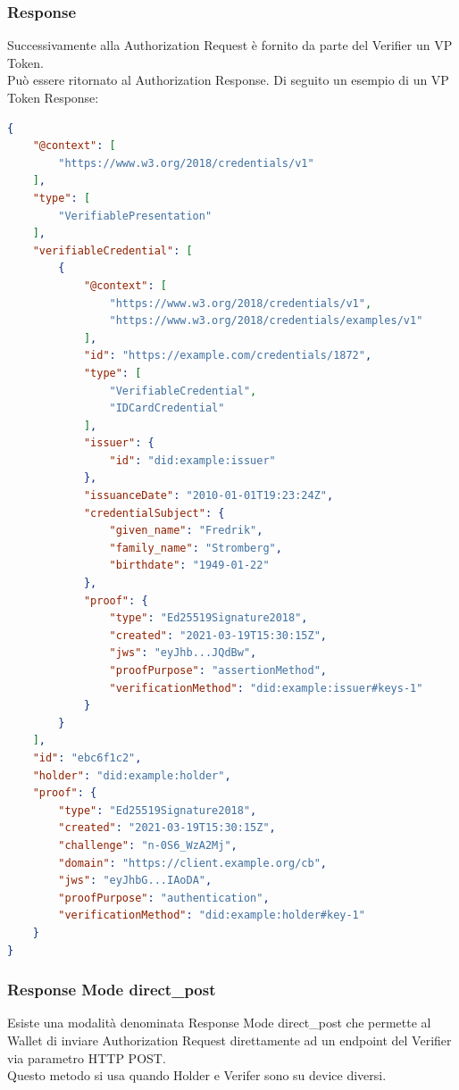 \subsubsection{Response}
Successivamente alla Authorization Request è fornito da parte del Verifier un VP Token.\\
Può essere ritornato al Authorization Response.
Di seguito un esempio di un VP Token Response:
\begin{lstlisting}[language=json,firstnumber=1]
{
    "@context": [
        "https://www.w3.org/2018/credentials/v1"
    ],
    "type": [
        "VerifiablePresentation"
    ],
    "verifiableCredential": [
        {
            "@context": [
                "https://www.w3.org/2018/credentials/v1",
                "https://www.w3.org/2018/credentials/examples/v1"
            ],
            "id": "https://example.com/credentials/1872",
            "type": [
                "VerifiableCredential",
                "IDCardCredential"
            ],
            "issuer": {
                "id": "did:example:issuer"
            },
            "issuanceDate": "2010-01-01T19:23:24Z",
            "credentialSubject": {
                "given_name": "Fredrik",
                "family_name": "Stromberg",
                "birthdate": "1949-01-22"
            },
            "proof": {
                "type": "Ed25519Signature2018",
                "created": "2021-03-19T15:30:15Z",
                "jws": "eyJhb...JQdBw",
                "proofPurpose": "assertionMethod",
                "verificationMethod": "did:example:issuer#keys-1"
            }
        }
    ],
    "id": "ebc6f1c2",
    "holder": "did:example:holder",
    "proof": {
        "type": "Ed25519Signature2018",
        "created": "2021-03-19T15:30:15Z",
        "challenge": "n-0S6_WzA2Mj",
        "domain": "https://client.example.org/cb",
        "jws": "eyJhbG...IAoDA",
        "proofPurpose": "authentication",
        "verificationMethod": "did:example:holder#key-1"
    }
}
\end{lstlisting}

\subsubsection{Response Mode direct\_post}
Esiste una modalità denominata Response Mode direct\_post che permette al Wallet di inviare Authorization Request 
direttamente ad un endpoint del Verifier via parametro HTTP POST.\\
Questo metodo si usa quando Holder e Verifer sono su device diversi.

